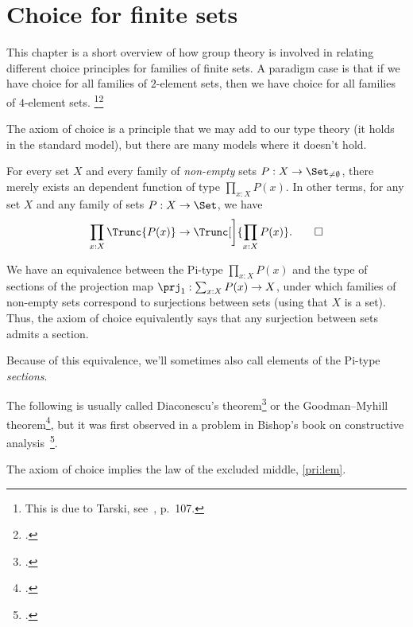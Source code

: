 \section{Choice for finite sets\titledagger}
\label{sec:choicefin}

This chapter is a short overview of how group theory is involved in
relating different choice principles for families of finite sets.  A
paradigm case is that if we have choice for all families of
$2$-element sets, then we have choice for all families of $4$-element
sets.%
\footnote{This is due to Tarski,
  see~\citeauthor{Jech-AC}\footnotemark{}, p.~107.}\footcitetext{Jech-AC}

The axiom of choice is a principle that we may add to our type theory
(it holds in the standard model), but there are many models where it doesn't hold.

\begin{principle}\label{pri:ac}
  For every set $X$ and every family of \emph{non-empty} sets
  $P : X \to \Set_{\ne\emptyset}$,
  there merely exists an dependent function of type $\prod_{x:X}P(x)$.
  In other terms, for any set $X$ and any family of sets $P:X\to\Set$,
  we have
  \begin{equation}\label{eq:ac-impl}
    \prod_{x:X}\Trunc{P(x)} \to \Trunc[\bigg]{\prod_{x:X}P(x)}.\qedhere
  \end{equation}
\end{principle}

\begin{remark}
  We have an equivalence between the Pi-type $\prod_{x:X}P(x)$ and the
  type of sections of the projection map $\prj_1 : \sum_{x:X}P(x) \to X$,
  under which families of non-empty sets correspond to surjections between sets
  (using that $X$ is a set).
  Thus, the axiom of choice equivalently says that any surjection
  between sets admits a section.

  Because of this equivalence, we'll sometimes also call elements of the
  Pi-type \emph{sections}.
\end{remark}

The following is usually called Diaconescu's theorem\footcite{Diaconescu} or the Goodman--Myhill theorem\footcite{Goodman-Myhill}, but it was first observed in a problem in Bishop's book on constructive analysis~\footcite{Bishop}.

\begin{theorem}
  The axiom of choice implies the law of the excluded middle, \cref{pri:lem}.
\end{theorem}

